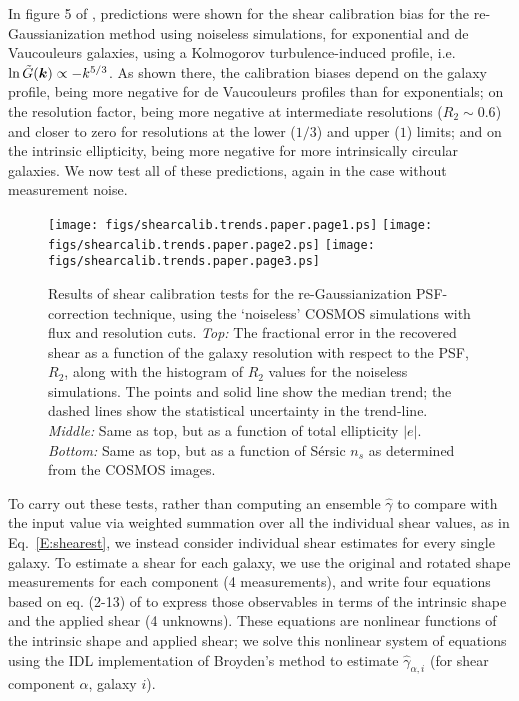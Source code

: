 \documentclass[twocolumn,useAMS,usenatbib]{mn2e}
\newcommand{\newtext}{}
\begin{document}
In figure 5 of \cite{2005MNRAS.361.1287M}, predictions were shown for
the shear calibration bias for the re-Gaussianization method using
noiseless simulations, for exponential and de Vaucouleurs galaxies,
using \newtext{a Kolmogorov turbulence-induced profile, i.e.
$\ln\tilde G({\bmath k})\propto -k^{5/3}$}.  As shown there, the calibration biases depend on
the galaxy profile, being more negative for de Vaucouleurs profiles
than for exponentials; on the resolution factor, being more negative
at intermediate resolutions ($R_2 \sim 0.6$) and closer to zero for
resolutions at the lower ($1/3$) and upper ($1$) limits; and on the
intrinsic ellipticity, being more negative for more intrinsically
circular galaxies. We now test all of these predictions, again in
the case without measurement noise.

\begin{figure}
\begin{center}
\texttt{[image: figs/shearcalib.trends.paper.page1.ps]}
\texttt{[image: figs/shearcalib.trends.paper.page2.ps]}
\texttt{[image: figs/shearcalib.trends.paper.page3.ps]}
\caption{\label{F:shearcalibtrends} Results of shear calibration tests
  for the re-Gaussianization PSF-correction technique, using the
  `noiseless' COSMOS simulations with flux and resolution cuts.
  {\em Top:} The fractional error in the recovered shear as a function
  of the galaxy resolution with respect to the PSF, $R_2$, along with
  the histogram of $R_2$ values for the noiseless simulations.  The points
  and solid line show the median trend; the dashed lines show the
  statistical uncertainty in the trend-line.  {\em
    Middle:} Same as top, but as a function of total ellipticity
  $|e|$.  {\em Bottom:} Same as top, but as a function of S\'ersic
  $n_s$ as determined from the COSMOS images.}
\end{center}
\end{figure}

To carry out these tests, rather than computing an ensemble
$\hat{\gamma}$ to compare with the input value via weighted summation
over all the individual shear values, as in Eq.~\eqref{E:shearest}, we
instead consider individual shear estimates for every single galaxy.
To estimate a shear for each galaxy, we use the original and rotated
shape measurements for each component (4 measurements), and write four
equations based on eq. (2-13) of \cite{2002AJ....123..583B} to express
those observables in terms of the intrinsic shape and the applied shear (4
unknowns).  These equations are nonlinear functions of the intrinsic
shape and applied shear; we solve this nonlinear system of equations
using the IDL implementation of Broyden's method to estimate
$\hat{\gamma}_{\alpha,i}$ (for shear component $\alpha$, galaxy $i$).  
\end{document}
